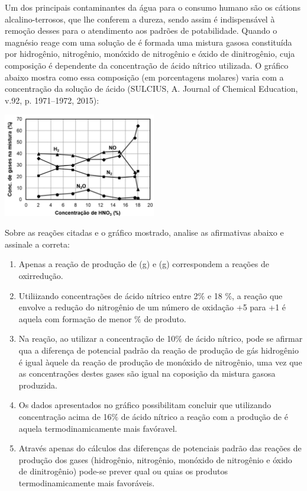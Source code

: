 Um dos principais contaminantes da água para o consumo humano são os cátions alcalino-terrosos, que lhe conferem a dureza, sendo assim é indispensável à remoção desses para o atendimento aos padrões de potabilidade. Quando o magnésio reage com uma solução de  é formada uma mistura gasosa constituída por hidrogênio, nitrogênio, monóxido de nitrogênio e óxido de dinitrogênio, cuja composição é dependente da concentração de ácido nítrico utilizada. O gráfico abaixo mostra como essa composição (em porcentagens molares) varia com a concentração da solução de ácido (SULCIUS, A. Journal of Chemical Education, v.92, p. 1971--1972, 2015):

\begin{center}
\includegraphics[width=0.5\textwidth]{figure.png}
\end{center}

Sobre as reações citadas e o gráfico mostrado, analise as afirmativas abaixo e assinale a correta:

\begin{enumerate}[label = (\alph*)]
	\item Apenas a reação de produção de (g) e (g) correspondem a reações de oxirredução.
	\item Utiliizando concentrações de ácido nítrico entre 2$\%$ e 18 $\%$, a reação que envolve a redução do nitrogênio de um número de oxidação +5 para +1 é aquela com formação de menor $\%$ de produto.
	\item Na reação, ao utilizar a concentração de 10$\%$ de ácido nítrico, pode se afirmar qua a diferença de potencial padrão da reação de produção de gás hidrogênio é igual àquele da reação de produção de monóxido de nitrogênio, uma vez que as concentrações destes gases são igual na coposição da mistura gasosa produzida.
	\item Os dados apresentados no gráfico possibilitam concluir que utilizando concentração acima de 16$\%$ de ácido nítrico a reação com a produção de  é aquela termodinamicamente mais favóravel. 
	\item Através apenas do cálculos das diferenças de potenciais padrão das reações de produção dos gases (hidrogênio, nitrogênio, monóxido de nitrogênio e óxido de dinitrogênio) pode-se prever qual ou quias os produtos termodinamicamente mais favoráveis.
\end{enumerate}
